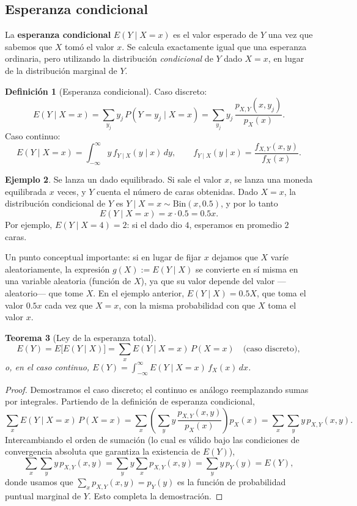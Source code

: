 \documentclass[11pt,a4paper]{article}
\theoremstyle{plain}
\newtheorem{teorema}{Teorema}[section]
\theoremstyle{definition}
\newtheorem{definicion}[teorema]{Definición}
\newtheorem{ejemplo}[teorema]{Ejemplo}
\theoremstyle{remark}
\begin{document}
\subsection{Esperanza condicional}

La \textbf{esperanza condicional} $E(Y\mid X=x)$ es el valor esperado de $Y$ una vez que sabemos que $X$ tomó el valor $x$. Se calcula exactamente igual que una esperanza ordinaria, pero utilizando la distribución \emph{condicional} de $Y$ dado $X=x$, en lugar de la distribución marginal de $Y$.

\begin{definicion}[Esperanza condicional]
Caso discreto:
\[
E(Y\mid X=x) = \sum_{y_j} y_j\, P(Y=y_j\mid X=x) = \sum_{y_j} y_j\, \frac{p_{X,Y}(x,y_j)}{p_X(x)}.
\]
Caso continuo:
\[
E(Y\mid X=x) = \int_{-\infty}^{\infty} y\, f_{Y\mid X}(y\mid x)\,dy, \qquad f_{Y\mid X}(y\mid x) = \frac{f_{X,Y}(x,y)}{f_X(x)}.
\]
\end{definicion}

\begin{ejemplo}
Se lanza un dado equilibrado. Si sale el valor $x$, se lanza una moneda equilibrada $x$ veces, y $Y$ cuenta el número de caras obtenidas. Dado $X=x$, la distribución condicional de $Y$ es $Y\mid X=x \sim \text{Bin}(x,0.5)$, y por lo tanto
\[
E(Y\mid X=x) = x\cdot 0.5 = 0.5x.
\]
Por ejemplo, $E(Y\mid X=4)=2$: si el dado dio $4$, esperamos en promedio $2$ caras.
\end{ejemplo}

Un punto conceptual importante: si en lugar de fijar $x$ dejamos que $X$ varíe aleatoriamente, la expresión $g(X):=E(Y\mid X)$ se convierte en sí misma en una variable aleatoria (función de $X$), ya que su valor depende del valor —aleatorio— que tome $X$. En el ejemplo anterior, $E(Y\mid X)=0.5X$, que toma el valor $0.5x$ cada vez que $X=x$, con la misma probabilidad con que $X$ toma el valor $x$.

\begin{teorema}[Ley de la esperanza total]
\[
E(Y) = E\big[E(Y\mid X)\big] = \sum_x E(Y\mid X=x)\,P(X=x) \quad\text{(caso discreto)},
\]
o, en el caso continuo, $\displaystyle E(Y) = \int_{-\infty}^\infty E(Y\mid X=x)\,f_X(x)\,dx$.
\end{teorema}

\begin{proof}
Demostramos el caso discreto; el continuo es análogo reemplazando sumas por integrales. Partiendo de la definición de esperanza condicional,
\[
\sum_x E(Y\mid X=x)\,P(X=x) = \sum_x \left(\sum_{y} y\, \frac{p_{X,Y}(x,y)}{p_X(x)}\right) p_X(x) = \sum_x \sum_y y\, p_{X,Y}(x,y).
\]
Intercambiando el orden de sumación (lo cual es válido bajo las condiciones de convergencia absoluta que garantiza la existencia de $E(Y)$),
\[
\sum_x\sum_y y\,p_{X,Y}(x,y) = \sum_y y \sum_x p_{X,Y}(x,y) = \sum_y y\, p_Y(y) = E(Y),
\]
donde usamos que $\sum_x p_{X,Y}(x,y) = p_Y(y)$ es la función de probabilidad puntual marginal de $Y$. Esto completa la demostración.
\end{proof}
\end{document}

